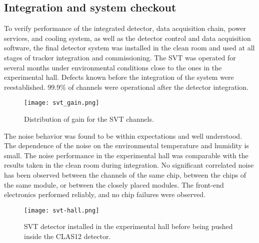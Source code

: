 %

\subsection{Integration and system checkout}

To verify performance of the integrated detector, data acquisition chain, power services, and cooling system, as well as the detector control and data acquisition software, the final detector system was installed in the clean room and used at all stages of tracker integration and commissioning. The SVT was operated for several months under environmental conditions close to the ones in the experimental hall. Defects known before the integration of the system were reestablished. 99.9$\%$ of channels were operational after the detector integration. 

\begin{figure}[hbt] 
\centering 
\texttt{[image: svt\_gain.png]}
\caption{Distribution of gain for the SVT channels.}
\label{fig:svt_gain}
\end{figure}

The noise behavior was found to be within expectations and well understood. The dependence of the noise on the environmental temperature and humidity is small. The noise performance in the experimental hall was comparable with the results taken in the clean room during integration. No significant correlated noise has been observed between the channels of the same chip, between the chips of the same module, or between the closely placed modules. The front-end electronics performed reliably, and no chip failures were observed. 
 
\begin{figure}[hbt] 
\centering 
\texttt{[image: svt-hall.png]}
\caption{SVT detector installed in the experimental hall before being pushed inside the CLAS12 detector.}
\label{fig:svt-hall}
\end{figure}

